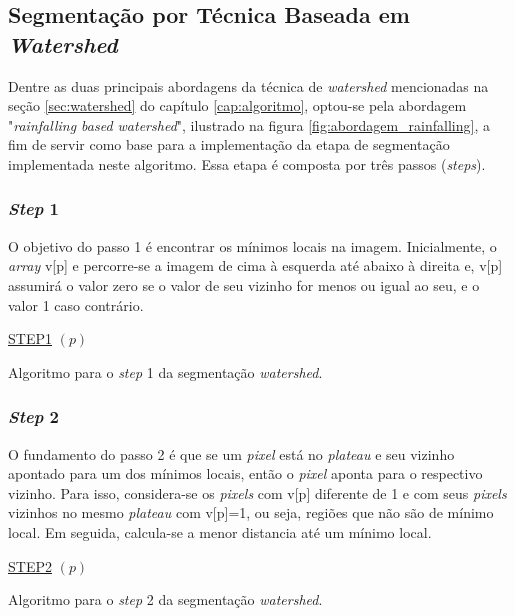 \subsection{Segmentação por Técnica Baseada em \textit{Watershed}}
Dentre as duas principais abordagens da técnica de \textit{watershed} mencionadas na seção \ref{sec:watershed} do capítulo \ref{cap:algoritmo}, optou-se pela abordagem "\textit{rainfalling based watershed}", ilustrado na figura \ref{fig:abordagem_rainfalling}, a fim de servir como base para a implementação da etapa de segmentação implementada neste algoritmo. Essa etapa é composta por três passos (\textit{steps}). 

\subsubsection{\textit{Step} 1}
O objetivo do passo 1 é encontrar os mínimos locais na imagem. Inicialmente, o \textit{array} v[p] e percorre-se a imagem de cima à esquerda até abaixo à direita e, v[p] assumirá o valor zero se o valor de seu vizinho for menos ou igual ao seu, e o valor 1 caso contrário.


\begin{algorithm}[H]
\SetAlgoLined


    \underline{STEP1} $(p)$\;
 
\caption{Algoritmo para o \textit{step} 1 da segmentação \textit{watershed}. \cite{ruparelia2012implementation}}
\end{algorithm}

\subsubsection{\textit{Step} 2} 
O fundamento do passo 2 é que se um \textit{pixel} está no \textit{plateau} e seu vizinho apontado para um dos mínimos locais, então o \textit{pixel} aponta para o respectivo vizinho. Para isso, considera-se os \textit{pixels} com v[p] diferente de 1 e com seus \textit{pixels} vizinhos no mesmo \textit{plateau} com v[p]=1, ou seja, regiões que não são de mínimo local. Em seguida, calcula-se a menor distancia até um mínimo local.

\begin{algorithm}[H]
\SetAlgoLined


    \underline{STEP2} $(p)$\;
		
 
\caption{Algoritmo para o \textit{step} 2 da segmentação \textit{watershed}. \cite{ruparelia2012implementation}}
\end{algorithm}



